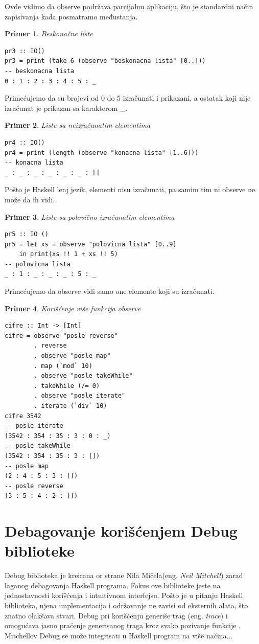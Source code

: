 \documentclass[a4paper]{article}
\newtheorem{primer}{Primer}[section]
\begin{document}
Ovde vidimo da observe podržava parcijalnu aplikaciju, što je standardni način zapisivanja kada posmatramo
međustanja.

\begin{primer} 
Beskonačne liste
\end{primer}
\begin{lstlisting}
pr3 :: IO()
pr3 = print (take 6 (observe "beskonacna lista" [0..]))
-- beskonacna lista
0 : 1 : 2 : 3 : 4 : 5 : _
\end{lstlisting}

Primećujemo da su brojevi od 0 do 5 izračunati i prikazani, a ostatak koji nije izračunat je prikazan sa
karakterom \_.

\begin{primer} 
 Liste sa neizračunatim elementima
\end{primer}
\begin{lstlisting}
pr4 :: IO()
pr4 = print (length (observe "konacna lista" [1..6]))
-- konacna lista
_ : _ : _ : _ : _ : _ : []
\end{lstlisting}

Pošto je Haskell lenj jezik, elementi nisu izračunati, pa samim tim ni observe ne može da ih vidi.

\begin{primer} 
Liste sa polovično izračunatim elementima
\end{primer}
\begin{lstlisting}
pr5 :: IO ()
pr5 = let xs = observe "polovicna lista" [0..9]
	in print(xs !! 1 + xs !! 5)
-- polovicna lista
_ : 1 : _ : _ : _ : 5 : _
\end{lstlisting}

Primećujemo da observe vidi samo one elemente koji su izračunati.

\begin{primer} 
Korišćenje više funkcija observe
\end{primer}
\begin{lstlisting}
cifre :: Int -> [Int]
cifre = observe "posle reverse" 
		. reverse
		. observe "posle map"
		. map (`mod` 10)
		. observe "posle takeWhile"
		. takeWhile (/= 0)
		. observe "posle iterate"
		. iterate (`div` 10)
cifre 3542
-- posle iterate
(3542 : 354 : 35 : 3 : 0 : _)
-- posle takeWhile
(3542 : 354 : 35 : 3 : [])
-- posle map
(2 : 4 : 5 : 3 : [])
-- posle reverse
(3 : 5 : 4 : 2 : [])
\end{lstlisting}

\section{Debagovanje korišćenjem Debug biblioteke}
Debug biblioteka je kreirana or strane Nila Mičela(eng. {\em Neil Mitchell}) zarad laganog debagovanja Haskell programa. Fokus ove biblioteke jeste na jednostavnosti korišćenja i intuitivnom interfejsu. Pošto je u pitanju Haskell biblioteka, njena implementacija i održavanje ne zavisi od eksternih alata, što znatno olakšava stvari. Debug pri korišćenju generiše trag (eng. {\em trace}) i omogućava jasno praćenje generisanog traga kroz svako pozivanje funkcije \cite{chitil2002transforming}.
Mitchellov Debug se može integrisati u Haskell program na više načina...
\end{document}
